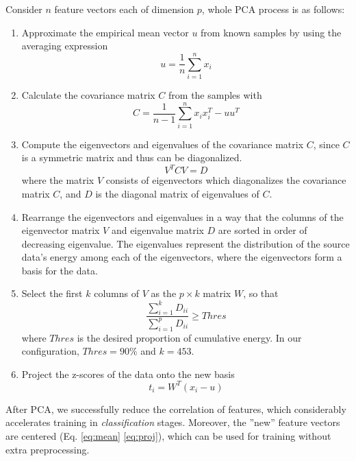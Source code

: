\documentclass[10pt,twocolumn,letterpaper]{article}
\begin{document}
	Consider $n$ feature vectors each of dimension $p$, whole PCA process is as follows:
\begin{enumerate}
\item Approximate the empirical mean vector $u$ from known samples by using the averaging expression
\begin{equation}
	u = \frac{1}{n} \sum_{i=1}^n x_i\label{eq:mean}
\end{equation}

\item Calculate the covariance matrix $C$ from the samples with
\begin{equation}
	C = \frac{1}{n-1} \sum_{i=1}^n x_i x_i^T - u u^T \label{eq:cx}
\end{equation}

\item Compute the eigenvectors and eigenvalues of the covariance matrix $C$, since $C$ is a symmetric matrix and thus can be diagonalized.
\begin{equation}
	V^T CV = D \label{eq:eig}
\end{equation}
	where the matrix $V$ consists of eigenvectors which diagonalizes the covariance matrix $C$, and $D$ is the diagonal matrix of eigenvalues of $C$.

\item Rearrange the eigenvectors and eigenvalues in a way that the columns of the eigenvector matrix $V$ and eigenvalue matrix $D$ are sorted in order of decreasing eigenvalue. The eigenvalues represent the distribution of the source data's energy among each of the eigenvectors, where the eigenvectors form a basis for the data.

\item Select the first $k$ columns of $V$ as the $p \times k$ matrix $W$, so that
\begin{equation}
	\frac{\sum_{i=1}^k D_{ii}}{\sum_{i=1}^p D_{ii}} \geq Thres \label{eq:dimR}
\end{equation}
	where $Thres$ is the desired proportion of cumulative energy. In our configuration, $Thres = 90\%$ and $k = 453$.

\item Project the z-scores of the data onto the new basis
\begin{equation}
	t_i = W^T (x_i - u)\label{eq:proj}
\end{equation}
\end{enumerate}
	
	After PCA, we successfully reduce the correlation of features, which considerably accelerates training in \textit{classification} stages. Moreover, the ''new'' feature vectors are centered (Eq. \eqref{eq:mean} \eqref{eq:proj}), which can be used for training without extra preprocessing.
\end{document}
